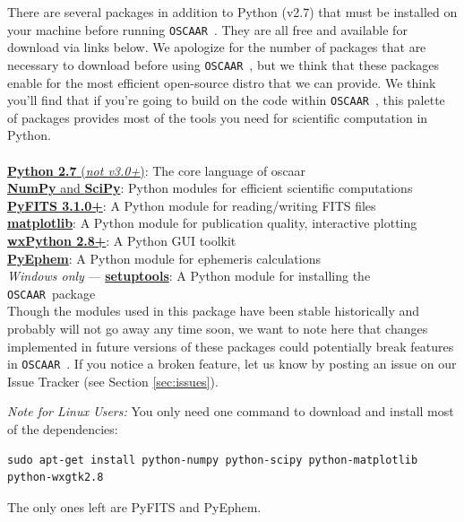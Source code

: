 \documentclass[a4paper]{article}
\newcommand{\code}[1]{\texttt{#1}}
\newcommand{\oscaar}{\code{OSCAAR}~}
\begin{document}
There are several packages in addition to Python (v2.7) that must be installed on your machine before running \oscaar. They are all free and available for download via links below. We apologize for the number of packages that are necessary to download before using \oscaar, but we think that these packages enable for the most efficient open-source distro that we can provide.  We think you'll find that if you're going to build on the code within \oscaar, this palette of packages provides most of the tools you need for scientific computation in Python. \\ \\
\noindent
\indent \href{http://www.python.org/getit/}{\textbf{Python 2.7} (\textit{not v3.0+})}: The core language of oscaar \\
\indent \href{http://new.scipy.org/download.html}{\textbf{NumPy} and \textbf{SciPy}}: Python modules for efficient scientific computations \\
\indent \href{http://www.stsci.edu/resources/software_hardware/pyfits/}{\textbf{PyFITS 3.1.0+}}: A Python module for reading/writing FITS files \\
\indent \href{http://matplotlib.sourceforge.net/index.html}{\textbf{matplotlib}}: A Python module for publication quality, interactive plotting\\
\indent \href{http://www.wxpython.org/download.php#stable}{\textbf{wxPython 2.8+}}: A Python GUI toolkit \\
\indent \href{http://rhodesmill.org/pyephem/}{\textbf{PyEphem}}: A Python module for ephemeris calculations\\
\indent \textit{Windows only} --- \href{https://pypi.python.org/pypi/setuptools}{\textbf{setuptools}}: A Python module for installing the \oscaar package\\

\noindent Though the modules used in this package have been stable historically and probably will not go away any time soon, we want to note here that changes implemented in future versions of these packages could potentially break features in \oscaar. If you notice a broken feature, let us know by posting an issue on our Issue Tracker (see Section \ref{sec:issues}).

\textit{Note for Linux Users:} You only need one command to download and install most of the dependencies:
\begin{verbatim}
sudo apt-get install python-numpy python-scipy python-matplotlib python-wxgtk2.8
\end{verbatim}
The only ones left are PyFITS and PyEphem.
\end{document}
